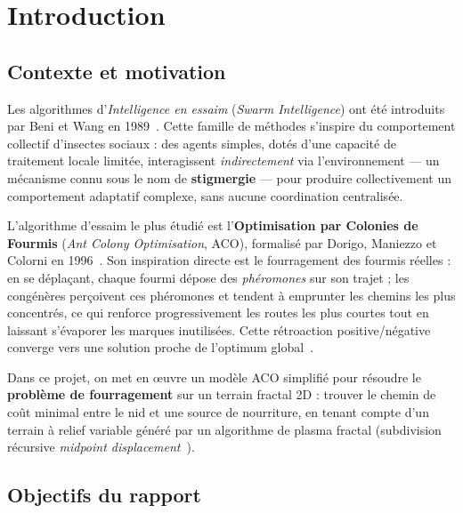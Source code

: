 \chapter*{Introduction}
\label{chap:intro}

\section{Contexte et motivation}

Les algorithmes d'\emph{Intelligence en essaim} (\textit{Swarm Intelligence}) ont été
introduits par Beni et Wang en 1989~\cite{beni1989swarm}. Cette famille de méthodes
s'inspire du comportement collectif d'insectes sociaux : des agents simples, dotés
d'une capacité de traitement locale limitée, interagissent \emph{indirectement} via
l'environnement — un mécanisme connu sous le nom de \textbf{stigmergie} — pour produire
collectivement un comportement adaptatif complexe, sans aucune coordination centralisée.

L'algorithme d'essaim le plus étudié est l'\textbf{Optimisation par Colonies de Fourmis}
(\textit{Ant Colony Optimisation}, ACO), formalisé par Dorigo, Maniezzo et Colorni
en 1996~\cite{dorigo1996ant}. Son inspiration directe est le fourragement des fourmis
réelles : en se déplaçant, chaque fourmi dépose des \emph{phéromones} sur son trajet ;
les congénères perçoivent ces phéromones et tendent à emprunter les chemins les plus
concentrés, ce qui renforce progressivement les routes les plus courtes tout en laissant
s'évaporer les marques inutilisées. Cette rétroaction positive/négative converge vers
une solution proche de l'optimum global~\cite{dorigo2004ant}.

Dans ce projet, on met en œuvre un modèle ACO simplifié pour résoudre le
\textbf{problème de fourragement} sur un terrain fractal 2D : trouver le chemin de
coût minimal entre le nid et une source de nourriture, en tenant compte d'un terrain
à relief variable généré par un algorithme de plasma fractal (subdivision récursive
\textit{midpoint displacement}~\cite{fournier1982midpoint}).

\section{Objectifs du rapport}


